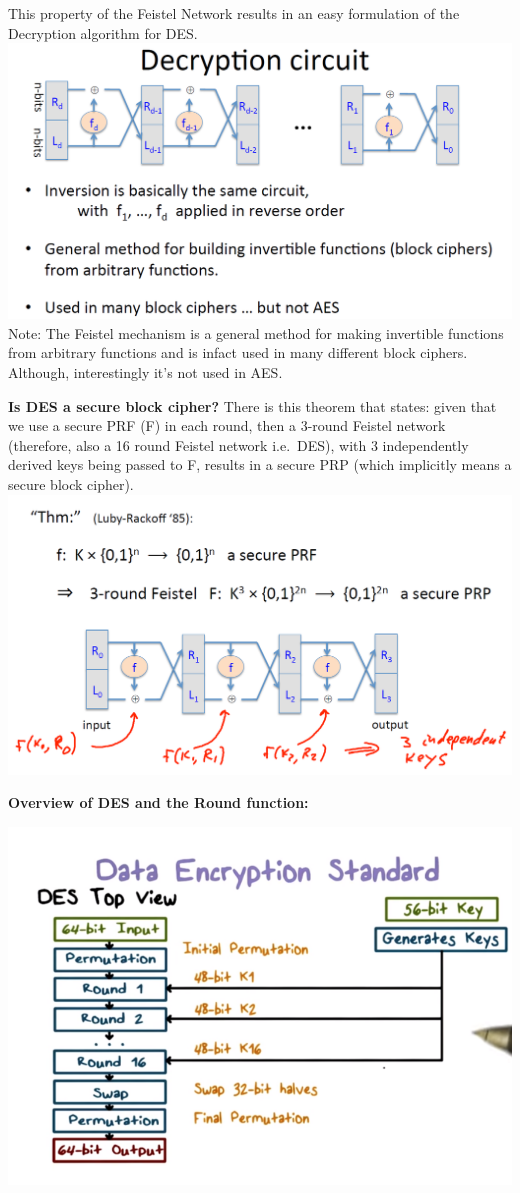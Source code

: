 \documentclass[11pt]{article}
\makeatletter
\def\maxwidth{\ifdim\Gin@nat@width>\linewidth\linewidth
    \else\Gin@nat@width\fi}
\let\Oldincludegraphics\includegraphics
\renewcommand{\includegraphics}[1]{\Oldincludegraphics[width=.8\maxwidth]{#1}}
\makeatother
\begin{document}
This property of the Feistel Network results in an easy formulation of
the Decryption algorithm for DES.
\includegraphics{./Images/DES-Decryption.png} Note: The Feistel
mechanism is a general method for making invertible functions from
arbitrary functions and is infact used in many different block ciphers.
Although, interestingly it's not used in AES.

\textbf{Is DES a secure block cipher?} There is this theorem that
states: given that we use a secure PRF (F) in each round, then a 3-round
Feistel network (therefore, also a 16 round Feistel network i.e.~DES),
with 3 independently derived keys being passed to F, results in a secure
PRP (which implicitly means a secure block cipher).
\includegraphics{./Images/SecureFeistel.png}

\textbf{Overview of DES and the Round function:}

\includegraphics{./Images/DES-View.png}
\end{document}

